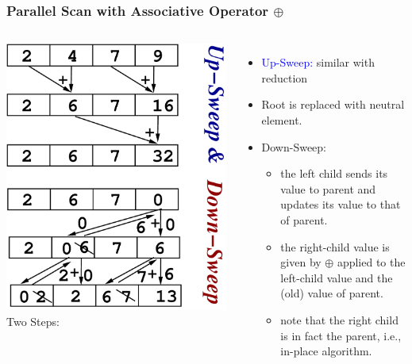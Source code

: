 \documentclass{beamer}
\newcommand{\blue}[1]{\textcolor{Blue}{{#1}}}
\newcommand{\emp}[1]{\textcolor{DikuRed}{ #1}}
\begin{document}
\begin{frame}[fragile,t]
  \frametitle{Parallel Scan with Associative Operator $\oplus$}
\bigskip

\begin{columns}
        \includegraphics[height=33ex]{Figures/ScanEg.pdf} 
Two Steps:
\begin{itemize}
    \item \blue{Up-Sweep:} similar with reduction
    \item Root is replaced with neutral element.
    \item \emp{Down-Sweep:} 
    \begin{itemize}
        \item the left child sends its value to parent and 
                updates its value to that of parent.
        \item the right-child value is given by $\oplus$ 
                applied to the left-child value and
                the (old) value of parent.
        \item note that the right child is in fact the parent,
                i.e., in-place algorithm.
    \end  {itemize}
\end  {itemize}
\end{columns}


\end{frame}
\end{document}
